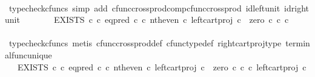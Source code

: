 \begin{isabellebody}
\ \ \ \ \isamarkupfalse%
\ {\isacharparenleft}{\kern0pt}typecheck{\isacharunderscore}{\kern0pt}cfuncs{\isacharcomma}{\kern0pt}\ simp\ add{\isacharcolon}{\kern0pt}\ cfunc{\isacharunderscore}{\kern0pt}cross{\isacharunderscore}{\kern0pt}prod{\isacharunderscore}{\kern0pt}comp{\isacharunderscore}{\kern0pt}cfunc{\isacharunderscore}{\kern0pt}cross{\isacharunderscore}{\kern0pt}prod\ id{\isacharunderscore}{\kern0pt}left{\isacharunderscore}{\kern0pt}unit{}\ id{\isacharunderscore}{\kern0pt}right{\isacharunderscore}{\kern0pt}unit{}{\isacharparenright}{\kern0pt}\isanewline
\ \ \isamarkupfalse%
\ \isamarkupfalse%
\ {\isachardoublequoteopen}{\isachardot}{\kern0pt}{\isachardot}{\kern0pt}{\isachardot}{\kern0pt}\ {\isacharequal}{\kern0pt}\ EXISTS\ {\isasymnat}\isactrlsub c\ {\isasymcirc}\isactrlsub c\ {\isacharparenleft}{\kern0pt}eq{\isacharunderscore}{\kern0pt}pred\ {\isasymnat}\isactrlsub c\ {\isasymcirc}\isactrlsub c\ {\isasymlangle}nth{\isacharunderscore}{\kern0pt}even\ {\isasymcirc}\isactrlsub c\ left{\isacharunderscore}{\kern0pt}cart{\isacharunderscore}{\kern0pt}proj\ {\isasymnat}\isactrlsub c\ {\isasymone}{\isacharcomma}{\kern0pt}\ zero\ {\isasymcirc}\isactrlsub c\ {\isasymbeta}\isactrlbsub {\isasymnat}\isactrlsub c\ {\isasymtimes}\isactrlsub c\ {\isasymone}\isactrlesub {\isasymrangle}\ {\isacharparenright}{\kern0pt}\isactrlsup {\isasymsharp}{\isachardoublequoteclose}\isanewline
\ \ \ \ \isamarkupfalse%
\ {\isacharparenleft}{\kern0pt}typecheck{\isacharunderscore}{\kern0pt}cfuncs{\isacharcomma}{\kern0pt}\ metis\ cfunc{\isacharunderscore}{\kern0pt}cross{\isacharunderscore}{\kern0pt}prod{\isacharunderscore}{\kern0pt}def\ cfunc{\isacharunderscore}{\kern0pt}type{\isacharunderscore}{\kern0pt}def\ right{\isacharunderscore}{\kern0pt}cart{\isacharunderscore}{\kern0pt}proj{\isacharunderscore}{\kern0pt}type\ terminal{\isacharunderscore}{\kern0pt}func{\isacharunderscore}{\kern0pt}unique{\isacharparenright}{\kern0pt}\isanewline
\ \ \isamarkupfalse%
\ \isamarkupfalse%
\ {\isachardoublequoteopen}{\isachardot}{\kern0pt}{\isachardot}{\kern0pt}{\isachardot}{\kern0pt}\ {\isacharequal}{\kern0pt}\ EXISTS\ {\isasymnat}\isactrlsub c\ {\isasymcirc}\isactrlsub c\ {\isacharparenleft}{\kern0pt}eq{\isacharunderscore}{\kern0pt}pred\ {\isasymnat}\isactrlsub c\ {\isasymcirc}\isactrlsub c\ {\isasymlangle}nth{\isacharunderscore}{\kern0pt}even\ {\isasymcirc}\isactrlsub c\ left{\isacharunderscore}{\kern0pt}cart{\isacharunderscore}{\kern0pt}proj\ {\isasymnat}\isactrlsub c\ {\isasymone}{\isacharcomma}{\kern0pt}\ {\isacharparenleft}{\kern0pt}zero\ {\isasymcirc}\isactrlsub c\ {\isasymbeta}\isactrlbsub {\isasymnat}\isactrlsub c\isactrlesub {\isacharparenright}{\kern0pt}\ {\isasymcirc}\isactrlsub c\ left{\isacharunderscore}{\kern0pt}cart{\isacharunderscore}{\kern0pt}proj\ {\isasymnat}\isactrlsub c\ {\isasymone}{\isasymrangle}\ {\isacharparenright}{\kern0pt}\isactrlsup {\isasymsharp}{\isachardoublequoteclose}\isanewline

\end{isabellebody}
